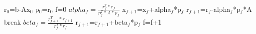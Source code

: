 \documentclass[12pt,a4paper]{report}
\author{Alexandros-Pana Oikonomou}
\begin{document}
\begin{algorithmic}
\STATE r$_0$=b-Ax$_0$
\STATE p$_0$=r$_0$
\STATE f=0
\STATE $alpha_f=\frac{r_f ^T*r_f}{p_f ^T*A*p_f}$
\STATE x$_{f+1}$=x$_f$+alpha$_f$*p$_f$
\STATE r$_{f+1}$=r$_f$-alpha$_f$*p$_f$*A
\STATE break
\ENDIF
\STATE $beta_f=\frac{r_{f+1} ^T*r_{f+1}}{r_f ^T*r_f}$
\STATE r$_{f+1}$=r$_{f+1}$+beta$_f$*p$_f$
\STATE f=f+1
\ENDFOR
\end{algorithmic}
\end{document}
